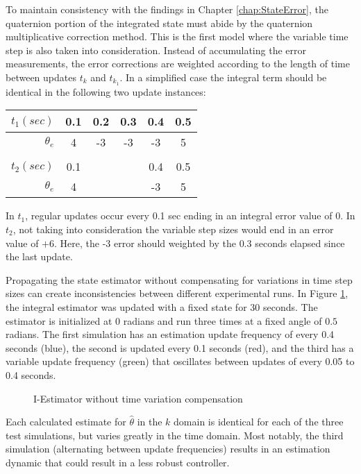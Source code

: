 To maintain consistency with the findings in Chapter \ref{chap:StateError}, the quaternion portion of the integrated state must abide by the quaternion multiplicative correction method.  This is the first model where the variable time step is also taken into consideration.  Instead of accumulating the error measurements, the error corrections are weighted according to the length of time between updates $t_k$ and $t_{k_1}$.  In a simplified case the integral term should be identical in the following two update instances:
\begin{table}[H]
  \centering
  \begin{tabular}{r|c|c|c|c|c}
    $t_1 (sec)$ & 0.1 & 0.2 & 0.3 & 0.4 & 0.5 \\ \hline
    $\theta_e$ & 4 & -3 & -3 & -3 & 5 \\
    \\
    $t_2 (sec)$ & 0.1 & & & 0.4 & 0.5 \\ \hline
    $\theta_e$ & 4 &  &  & -3 & 5 \\
  \end{tabular}
  \label{tbl:VariableUpdates}
\end{table}
In $t_1$, regular updates occur every 0.1 sec ending in an integral error value of 0.  In $t_2$, not taking into consideration the variable step sizes would end in an error value of $+6$.  Here, the -3 error should weighted by the $0.3$ seconds elapsed since the last update.

Propagating the state estimator without compensating for variations in time step sizes can create inconsistencies between different experimental runs.  In Figure \ref{fig:IEstimatorwithouttimevariationcompensation}, the integral estimator was updated with a fixed state for 30 seconds.  The estimator is initialized at $0$ radians and run three times at a fixed angle of $0.5$ radians.  The first simulation has an estimation update frequency of every 0.4 seconds (blue), the second is updated every 0.1 seconds (red), and the third has a variable update frequency (green) that oscillates between updates of every 0.05 to 0.4 seconds.

\begin{figure}[H]
  \centerline{}
  \caption{I-Estimator without time variation compensation}
  \label{fig:IEstimatorwithouttimevariationcompensation}
\end{figure}

Each calculated estimate for $\hat{\theta}$ in the $k$ domain is identical for each of the three test simulations, but varies greatly in the time domain.  Most notably, the third simulation (alternating between update frequencies) results in an estimation dynamic that could result in a less robust controller.

